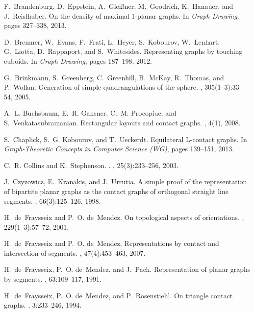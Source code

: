 \documentclass{article}
\begin{document}
\begin{thebibliography}{10}
F.~Brandenburg, D.~Eppstein, A.~Glei{\ss}ner, M.~Goodrich, K.~Hanauer, and
  J.~Reislhuber.
\newblock On the density of maximal 1-planar graphs.
\newblock In {\em Graph Drawing}, pages 327--338, 2013.

D.~Bremner, W.~Evans, F.~Frati, L.~Heyer, S.~Kobourov, W.~Lenhart, G.~Liotta,
  D.~Rappaport, and S.~Whitesides.
\newblock Representing graphs by touching cuboids.
\newblock In {\em Graph Drawing}, pages 187--198, 2012.

G.~Brinkmann, S.~Greenberg, C.~Greenhill, B.~McKay, R.~Thomas, and P.~Wollan.
\newblock Generation of simple quadrangulations of the sphere.
, 305(1--3):33--54, 2005.

A.~L. Buchsbaum, E.~R. Gansner, C.~M. Procopiuc, and S.~Venkatasubramanian.
\newblock Rectangular layouts and contact graphs.
, 4(1), 2008.

S.~Chaplick, S.~G. Kobourov, and T.~Ueckerdt.
\newblock Equilateral {L}-contact graphs.
\newblock In {\em Graph-Theoretic Concepts in Computer Science (WG)}, pages
  139--151, 2013.

C.~R. Collins and K.~Stephenson.
.
,
  25(3):233--256, 2003.

J.~Czyzowicz, E.~Kranakis, and J.~Urrutia.
\newblock A simple proof of the representation of bipartite planar graphs as
  the contact graphs of orthogonal straight line segments.
, 66(3):125--126, 1998.

H.~de~Fraysseix and P.~O. de~Mendez.
\newblock On topological aspects of orientations.
, 229(1--3):57--72, 2001.

H.~de~Fraysseix and P.~O. de~Mendez.
\newblock Representations by contact and intersection of segments.
, 47(4):453--463, 2007.

H.~de~Fraysseix, P.~O. de~Mendez, and J.~Pach.
\newblock Representation of planar graphs by segments.
, 63:109--117, 1991.

H.~de~Fraysseix, P.~O. de~Mendez, and P.~Rosenstiehl.
\newblock On triangle contact graphs.
, 3:233--246, 1994.


\end{thebibliography}
\end{document}

